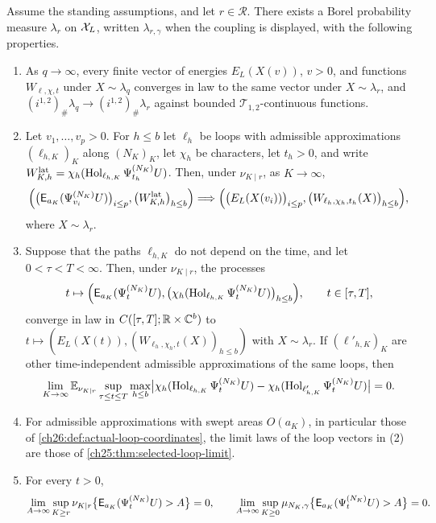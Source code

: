 \begin{theorem}\label{ch26:thm:selected-energy-loop-limit}
Assume the standing assumptions, and let $r\in\mathcal R$. There exists a Borel probability measure $\lambda_r$ on $\mathcal X_L$, written $\lambda_{r,\gamma}$ when the coupling is displayed, with the following properties.
\begin{enumerate}
\item As $q\to\infty$, every finite vector of energies $E_L(X(v))$, $v>0$, and functions $W_{\ell,\chi,t}$ under $X\sim\lambda_q$ converges in law to the same vector under $X\sim\lambda_r$, and $(i^{1,2})_\#\lambda_q\to(i^{1,2})_\#\lambda_r$ against bounded $\mathcal T_{1,2}$-continuous functions.
\item Let $v_1,\dots,v_p>0$. For $h\le b$ let $\ell_h$ be loops with admissible approximations $(\ell_{h,K})_K$ along $(N_K)_K$, let $\chi_h$ be characters, let $t_h>0$, and write $W^{\mathrm{lat}}_{K,h}=\chi_h(\operatorname{Hol}_{\ell_{h,K}}\Psi^{(N_K)}_{t_h}U)$. Then, under $\nu_{K\mid r}$, as $K\to\infty$,
\[
 \Bigl(\bigl(\mathsf E_{a_K}(\Psi^{(N_K)}_{v_i}U)\bigr)_{i\le p},\bigl(W^{\mathrm{lat}}_{K,h}\bigr)_{h\le b}\Bigr)\Longrightarrow\Bigl(\bigl(E_L(X(v_i))\bigr)_{i\le p},\bigl(W_{\ell_h,\chi_h,t_h}(X)\bigr)_{h\le b}\Bigr),
\]
where $X\sim\lambda_r$.
\item Suppose that the paths $\ell_{h,K}$ do not depend on the time, and let $0<\tau<T<\infty$. Then, under $\nu_{K\mid r}$, the processes
\[
 t\mapsto\Bigl(\mathsf E_{a_K}(\Psi^{(N_K)}_tU),\bigl(\chi_h(\operatorname{Hol}_{\ell_{h,K}}\Psi^{(N_K)}_tU)\bigr)_{h\le b}\Bigr),\qquad t\in[\tau,T],
\]
converge in law in $C([\tau,T];\mathbb R\times\mathbb C^b)$ to $t\mapsto(E_L(X(t)),(W_{\ell_h,\chi_h,t}(X))_{h\le b})$ with $X\sim\lambda_r$. If $(\ell'_{h,K})_K$ are other time-independent admissible approximations of the same loops, then
\[
 \lim_{K\to\infty}\mathbb E_{\nu_{K\mid r}}\sup_{\tau\le t\le T}\max_{h\le b}\bigl\lvert\chi_h(\operatorname{Hol}_{\ell_{h,K}}\Psi^{(N_K)}_tU)-\chi_h(\operatorname{Hol}_{\ell'_{h,K}}\Psi^{(N_K)}_tU)\bigr\rvert=0 .
\]
\item For admissible approximations with swept areas $O(a_K)$, in particular those of \cref{ch26:def:actual-loop-coordinates}, the limit laws of the loop vectors in (2) are those of \cref{ch25:thm:selected-loop-limit}.
\item For every $t>0$,
\[
 \lim_{A\to\infty}\sup_{K\ge r}\nu_{K\mid r}\bigl\{\mathsf E_{a_K}(\Psi^{(N_K)}_tU)>A\bigr\}=0,\qquad \lim_{A\to\infty}\sup_{K\ge0}\mu_{N_K,\gamma}\bigl\{\mathsf E_{a_K}(\Psi^{(N_K)}_tU)>A\bigr\}=0 .
\]
\end{enumerate}
\end{theorem}

